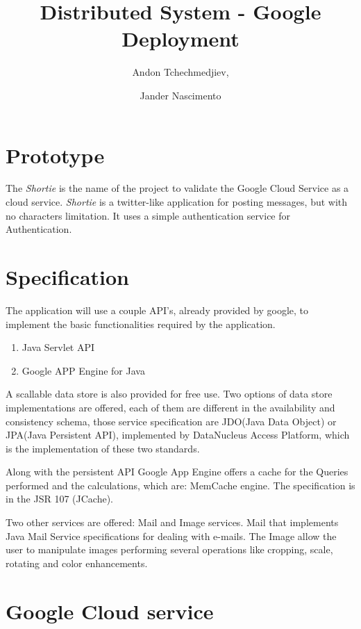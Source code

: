 \documentclass{article}
\begin{document}
\title{Distributed System - Google Deployment}

\author{Andon Tchechmedjiev, 
\and Jander Nascimento}

\maketitle

\section{Prototype}

The \emph{Shortie} is the name of the project to validate the Google Cloud Service as a cloud service.
\emph{Shortie} is a twitter-like application for posting messages, but with no characters limitation. It uses a simple authentication service for Authentication.

\section{Specification}

The application will use a couple API's, already provided by google, to implement the basic functionalities required by the application. 

\begin{enumerate}
\item Java Servlet API
\item Google APP Engine for Java
\end{enumerate}


A scallable data store is also provided for free use. Two options of data store implementations are offered, each of them are different in the availability and consistency schema, those service specification are JDO(Java Data Object) or JPA(Java Persistent API), implemented by DataNucleus Access Platform, which is the implementation of these two standards.

Along with the persistent API Google App Engine offers a cache for the Queries performed and the calculations, which are: MemCache engine. The specification is in the JSR 107 (JCache).

Two other services are offered: Mail and Image services. Mail that implements Java Mail Service specifications for dealing with e-mails. The Image allow the user to manipulate images performing several operations like cropping, scale, rotating and color enhancements.

\section{Google Cloud service}
\end{document}
